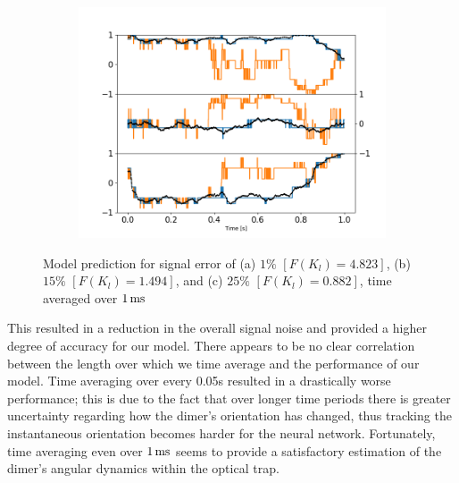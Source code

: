 \begin{figure}[h!]
\begin{subfigure}{0.32\textwidth}
		\includegraphics[width=\textwidth]{fig11c.png}
	\end{subfigure}
	\caption{Model prediction for signal error of (a) $1\%$ $[F(K_l)=4.823]$,  (b) $15\%$ $[F(K_l)=1.494]$, and (c) $25\%$ $[F(K_l)=0.882]$, time averaged over $1\,{\rm ms}$}
	\label{fig:time average}
\end{figure}
This resulted in a reduction in the overall signal noise and provided a higher degree of accuracy for our model. There appears to be no clear correlation between the length over which we time average and the performance of our model. Time averaging over every 0.05s resulted in a drastically worse performance; this is due to the fact that over longer time periods there is greater uncertainty regarding how the dimer's orientation has changed, thus tracking the instantaneous orientation becomes harder for the neural network. Fortunately, time averaging even over $1\,{\rm ms}$ seems to provide a satisfactory estimation of the dimer's angular dynamics within the optical trap.

